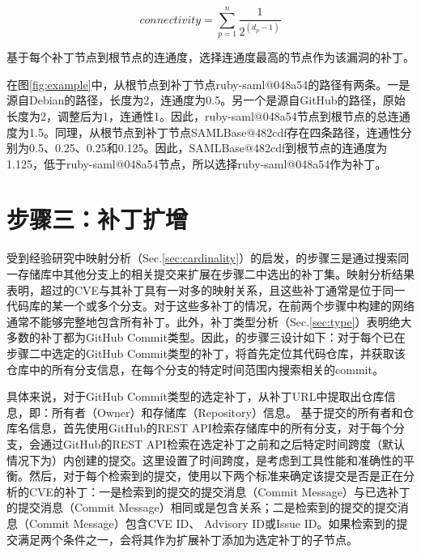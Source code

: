 \begin{equation}\label{eq:connectivity}
    connectivity =\sum_{p=1}^{n}   \frac{1}{2^{({d}_{p} -1)}}
\end{equation}

基于每个补丁节点到根节点的连通度，\tool 选择连通度最高的节点作为该漏洞的补丁。

\begin{exmp}
在图\ref{fig:example}中，从根节点到补丁节点ruby-saml@048a54的路径有两条。一是源自Debian的路径，长度为2，连通度为0.5。另一个是源自GitHub的路径，原始长度为2，调整后为1，连通性1。因此，ruby-saml@048a54节点到根节点的总连通度为1.5。同理，从根节点到补丁节点SAMLBase@482cdf存在四条路径，连通性分别为0.5、0.25、0.25和0.125。因此，SAMLBase@482cdf到根节点的连通度为1.125，低于ruby-saml@048a54节点，所以\tool 选择ruby-saml@048a54作为补丁。%
\end{exmp}


\section{步骤三：补丁扩增}
受到经验研究中映射分析（Sec.\ref{sec:cardinality}）的启发，\tool 的步骤三是通过搜索同一存储库中其他分支上的相关提交来扩展在步骤二中选出的补丁集。映射分析结果表明，超过的CVE与其补丁具有一对多的映射关系，且这些补丁通常是位于同一代码库的某一个或多个分支。对于这些多补丁的情况，\tool 在前两个步骤中构建的网络通常不能够完整地包含所有补丁。此外，补丁类型分析（Sec.\ref{sec:type}）表明绝大多数的补丁都为GitHub Commit类型。因此，\tool 的步骤三设计如下：对于每个已在步骤二中选定的GitHub Commit类型的补丁，\tool 将首先定位其代码仓库，并获取该仓库中的所有分支信息，在每个分支的特定时间范围内搜索相关的commit。


具体来说，对于GitHub Commit类型的选定补丁，\tool 从补丁URL中提取出仓库信息，即：所有者（Owner）和存储库（Repository）信息。
基于提交的所有者和仓库名信息，\tool 首先使用GitHub的REST API\cite{github-api-2}检索存储库中的所有分支，对于每个分支，\tool 会通过GitHub的REST API\cite{github-api-3}检索在选定补丁之前和之后特定时间跨度（默认情况下为）内创建的提交。这里设置了时间跨度，是考虑到工具性能和准确性的平衡。然后，对于每个检索到的提交，\tool 使用以下两个标准来确定该提交是否是正在分析的CVE的补丁：一是检索到的提交的提交消息（Commit Message）与已选补丁的提交消息（Commit Message）相同或是包含关系；二是检索到的提交的提交消息（Commit Message）包含CVE ID、 Advisory ID或Issue ID。如果检索到的提交满足两个条件之一，\tool 会将其作为扩展补丁添加为选定补丁的子节点。

